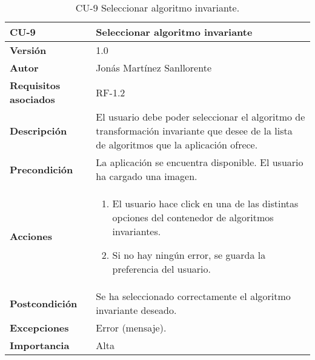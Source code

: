 \begin{table}[p]
	\centering
	\begin{tabularx}{\linewidth}{ p{} p{} }
		\toprule
		\textbf{CU-9}    & \textbf{Seleccionar algoritmo invariante}\\
		\toprule
		\textbf{Versión}              & 1.0    \\
		\textbf{Autor}                & Jonás Martínez Sanllorente \\
		\textbf{Requisitos asociados} & RF-1.2 \\
		\textbf{Descripción}          & El usuario debe poder seleccionar el algoritmo de transformación invariante que desee de la lista de algoritmos que la aplicación ofrece. \\
		\textbf{Precondición}         & La aplicación se encuentra disponible.\newline
                                        El usuario ha cargado una imagen. \\
		\textbf{Acciones}             &
		\begin{enumerate}
			\def\labelenumi{\arabic{enumi}.}
			\tightlist
			\item El usuario hace click en una de las distintas opciones del contenedor de algoritmos invariantes.
			\item Si no hay ningún error, se guarda la preferencia del usuario.
		\end{enumerate}\\
		\textbf{Postcondición}        & Se ha seleccionado correctamente el algoritmo invariante deseado. \\
		\textbf{Excepciones}          & Error (mensaje). \\
		\textbf{Importancia}          & Alta \\
		\bottomrule
	\end{tabularx}
	\caption{CU-9 Seleccionar algoritmo invariante.}
\end{table}

